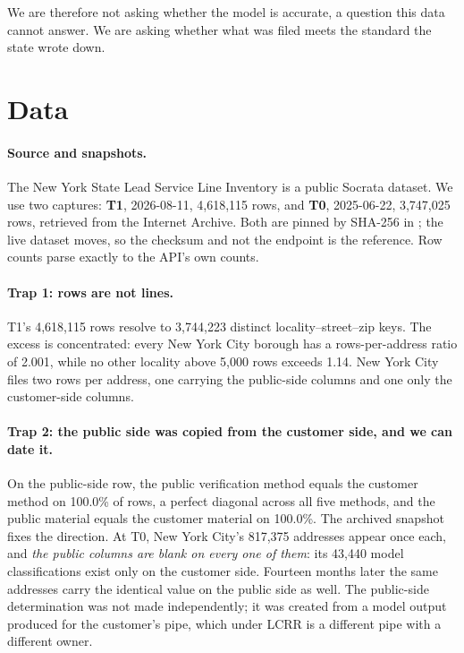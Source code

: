 \documentclass[11pt]{article}
\begin{document}
We are therefore not asking whether the model is accurate, a question this data cannot answer.
We are asking whether what was filed meets the standard the state wrote down.

\section{Data}\label{sec:data}

\paragraph{Source and snapshots.}
The New York State Lead Service Line Inventory \cite{nyslsl2026} is a public Socrata dataset.
We use two captures: \textbf{T1}, 2026-08-11, 4,618,115 rows, and \textbf{T0}, 2025-06-22,
3,747,025 rows, retrieved from the Internet Archive. Both are pinned by SHA-256 in
\cite{nyslsl2026}; the live dataset moves, so the checksum and not the endpoint is the
reference. Row counts parse exactly to the API's own counts.

\paragraph{Trap 1: rows are not lines.}
T1's 4,618,115 rows resolve to 3,744,223 distinct \mbox{locality}--\mbox{street}--\mbox{zip}
keys. The excess is concentrated: every New York City borough has a rows-per-address ratio of
2.001, while no other locality above 5,000 rows exceeds 1.14. New York City files two rows per
address, one carrying the public-side columns and one only the customer-side columns.

\paragraph{Trap 2: the public side was copied from the customer side, and we can date it.}
On the public-side row, the public verification method equals the customer method on 100.0\% of
rows, a perfect diagonal across all five methods, and the public material equals the customer
material on 100.0\%. The archived snapshot fixes the direction. At T0, New York City's 817,375
addresses appear once each, and \emph{the public columns are blank on every one of them}: its
43,440 model classifications exist only on the customer side. Fourteen months later the same
addresses carry the identical value on the public side as well. The public-side determination
was not made independently; it was created from a model output produced for the customer's
pipe, which under LCRR is a different pipe with a different owner.
\end{document}
